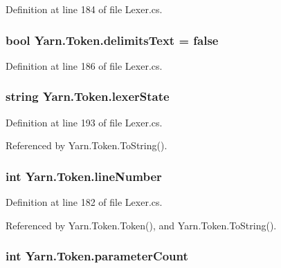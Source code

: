 Definition at line 184 of file Lexer.\-cs.

\hypertarget{a00173_af15d26fa4e6f276ab58ff66d3c4203da}{
\subsubsection[{delimits\-Text}]{\setlength{\rightskip}{0pt plus 5cm}bool Yarn.\-Token.\-delimits\-Text = false}}\label{a00173_af15d26fa4e6f276ab58ff66d3c4203da}


Definition at line 186 of file Lexer.\-cs.

\hypertarget{a00173_a710099e7abe84f30864a320cc7464214}{
\subsubsection[{lexer\-State}]{\setlength{\rightskip}{0pt plus 5cm}string Yarn.\-Token.\-lexer\-State}}\label{a00173_a710099e7abe84f30864a320cc7464214}


Definition at line 193 of file Lexer.\-cs.



Referenced by Yarn.\-Token.\-To\-String().

\hypertarget{a00173_a80fe710713201bb793a41452e314a721}{
\subsubsection[{line\-Number}]{\setlength{\rightskip}{0pt plus 5cm}int Yarn.\-Token.\-line\-Number}}\label{a00173_a80fe710713201bb793a41452e314a721}


Definition at line 182 of file Lexer.\-cs.



Referenced by Yarn.\-Token.\-Token(), and Yarn.\-Token.\-To\-String().

\hypertarget{a00173_adf11c0d29b66935a8d8109d6308d0488}{
\subsubsection[{parameter\-Count}]{\setlength{\rightskip}{0pt plus 5cm}int Yarn.\-Token.\-parameter\-Count}}\label{a00173_adf11c0d29b66935a8d8109d6308d0488}


